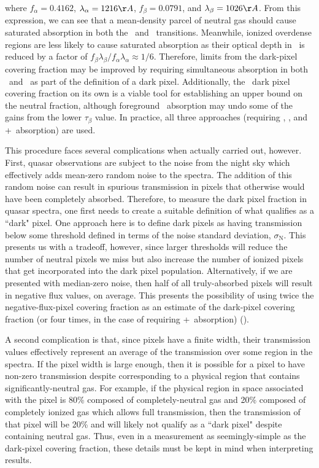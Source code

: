 where $f_{\alpha} = 0.4162$, $\lambda_{\alpha} = 1216 \AA$, $f_{\beta} = 0.0791$, and $\lambda_{\beta} = 1026\AA$. From this expression, we can see that a mean-density parcel of neutral gas should cause saturated absorption in both the \lya\ and \lyb\ transitions. Meanwhile, ionized overdense regions are less likely to cause saturated absorption as their optical depth in \lyb\ is reduced by a factor of $f_{\beta}\lambda_{\beta}/f_{\alpha}\lambda_{\alpha} \approx 1/6$. Therefore, limits from the dark-pixel covering fraction may be improved by requiring simultaneous absorption in both \lya\ and \lyb\ as part of the definition of a dark pixel. Additionally, the \lyb\ dark pixel covering fraction on its own is a viable tool for establishing an upper bound on the neutral fraction, although foreground \lya\ absorption may undo some of the gains from the lower $\tau_{\beta}$ value. In practice, all three approaches (requiring \lya, \lyb, and \lya +\lyb\ absorption) are used. 

This procedure faces several complications when actually carried out, however. First, quasar observations are subject to the noise from the night sky which effectively adds mean-zero random noise to the spectra. The addition of this random noise can result in spurious transmission in pixels that otherwise would have been completely absorbed. Therefore, to measure the dark pixel fraction in quasar spectra, one first needs to create a suitable definition of what qualifies as a ``dark" pixel. One approach here is to define dark pixels as having transmission below some threshold defined in terms of the noise standard deviation, $\sigma_{\text{N}}$. This presents us with a tradeoff, however, since larger thresholds will reduce the number of neutral pixels we miss but also increase the number of ionized pixels that get incorporated into the dark pixel population. Alternatively, if we are presented with median-zero noise, then half of all truly-absorbed pixels will result in negative flux values, on average. This presents the possibility of using twice the negative-flux-pixel covering fraction as an estimate of the dark-pixel covering fraction (or four times, in the case of requiring \lya +\lyb\ absorption) (\citealt{McGreer:2014qwa}). 

A second complication is that, since pixels have a finite width, their transmission values effectively represent an average of the transmission over some region in the spectra. If the pixel width is large enough, then it is possible for a pixel to have non-zero transmission despite corresponding to a physical region that contains significantly-neutral gas. For example, if the physical region in space associated with the pixel is 80\% composed of completely-neutral gas and 20\% composed of completely ionized gas which allows full transmission, then the transmission of that pixel will be 20\% and will likely not qualify as a ``dark pixel" despite containing neutral gas. Thus, even in a measurement as seemingly-simple as the dark-pixel covering fraction, these details must be kept in mind when interpreting results. 

